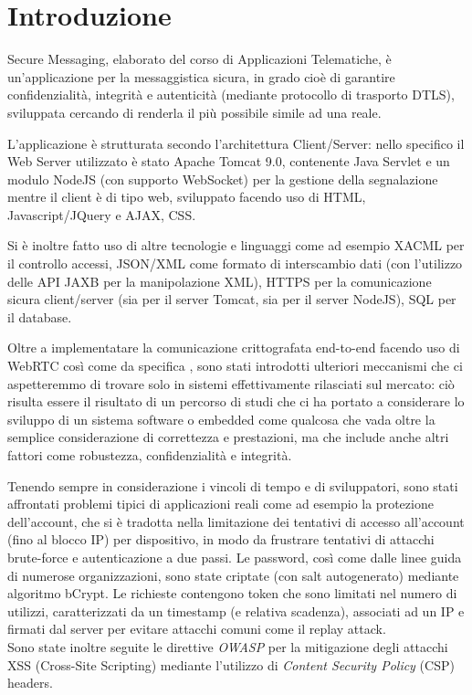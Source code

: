 
\chapter{Introduzione}


Secure Messaging, elaborato del corso di Applicazioni Telematiche, è un'applicazione per la messaggistica sicura, in grado cioè di garantire confidenzialità, integrità e autenticità (mediante protocollo di trasporto DTLS), sviluppata cercando di renderla il più possibile simile ad una reale.
 
L'applicazione è strutturata secondo l'architettura Client/Server: nello specifico il Web Server utilizzato è stato Apache Tomcat 9.0, contenente Java Servlet e un modulo NodeJS (con supporto WebSocket) per la gestione della segnalazione  mentre il client è di tipo web, sviluppato facendo uso di HTML, Javascript/JQuery e AJAX, CSS.

Si è inoltre fatto uso di altre tecnologie e linguaggi come ad esempio XACML per il controllo accessi, JSON/XML come formato di interscambio dati (con l'utilizzo delle API JAXB per la manipolazione XML), HTTPS per la comunicazione sicura client/server (sia per il server Tomcat, sia per il server NodeJS), SQL per il database.

Oltre a implementatare la comunicazione crittografata end-to-end facendo uso di WebRTC così come da specifica , sono stati introdotti ulteriori meccanismi che ci aspetteremmo di trovare solo in sistemi effettivamente rilasciati sul mercato: ciò risulta essere il risultato di un percorso di studi che ci ha portato a considerare lo sviluppo di un sistema software o embedded come qualcosa che vada oltre la semplice considerazione di correttezza e prestazioni, ma che include anche altri fattori come robustezza, confidenzialità e integrità.

Tenendo sempre in considerazione i vincoli di tempo e di sviluppatori, sono stati affrontati problemi tipici di applicazioni reali come ad esempio la protezione dell'account, che si è tradotta nella limitazione dei tentativi di accesso all'account (fino al blocco IP) per dispositivo, in modo da frustrare tentativi di attacchi brute-force e autenticazione a due passi. Le password, così come dalle linee guida di numerose organizzazioni, sono state criptate (con salt autogenerato) mediante algoritmo bCrypt. Le richieste contengono token che sono limitati nel numero di utilizzi, caratterizzati da un timestamp (e relativa scadenza), associati ad un IP e firmati dal server per evitare attacchi comuni come il replay attack.\\
Sono state inoltre seguite le direttive \textit{OWASP} per la mitigazione degli attacchi XSS (Cross-Site Scripting) mediante l'utilizzo di \textit{Content Security Policy} (CSP) headers.

